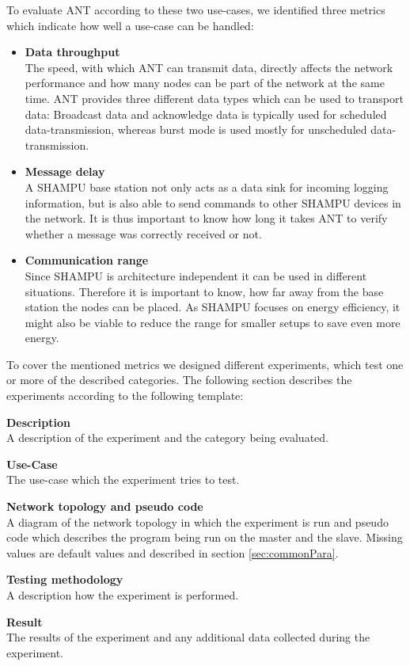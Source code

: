 To evaluate ANT according to these two use-cases, we identified three metrics which indicate how well a use-case can be handled:
	\begin{itemize}
		\item {\textbf{Data throughput }} \hfill \\ The speed, with which ANT can transmit data, directly affects the network performance and how many nodes can be part of the network at the same time. ANT provides three different data types which can be used to transport data: Broadcast data and acknowledge data is typically used for scheduled data-transmission, whereas burst mode is used mostly for unscheduled data-transmission. 		
		
		\item {\textbf{Message delay}} \hfill \\ A SHAMPU base station not only acts as a data sink for incoming logging information, but is also able to send commands to other SHAMPU devices in the network.
		It is thus important to know how long it takes ANT to verify whether a message was correctly received or not.
		
		\item {\textbf{Communication range}} \hfill \\ Since SHAMPU is architecture independent it can be used in different situations. Therefore it is important to know, how far away from the base station the nodes can be placed. As SHAMPU focuses on energy efficiency, it might also be viable to reduce the range for smaller setups to save even more energy.
	\end{itemize}

To cover the mentioned metrics we designed different experiments, which test one or more of the described categories. The following section describes the experiments according to the following template:

\begin{description}
	\item{\textbf{Description}} \hfill \\ A description of the experiment and the category being evaluated.
	\item{\textbf{Use-Case}} \hfill \\ The use-case which the experiment tries to test.
	\item{\textbf{Network topology and pseudo code}} \hfill \\ A diagram of the network topology in which the experiment is run and pseudo code which describes the program being run on the master and the slave. Missing values are default values and described in section \ref{sec:commonPara}.
	\item{\textbf{Testing methodology}} \hfill \\ A description how the experiment is performed.
	\item{\textbf{Result}} \hfill \\ The results of the experiment and any additional data collected during the experiment.
\end{description}

